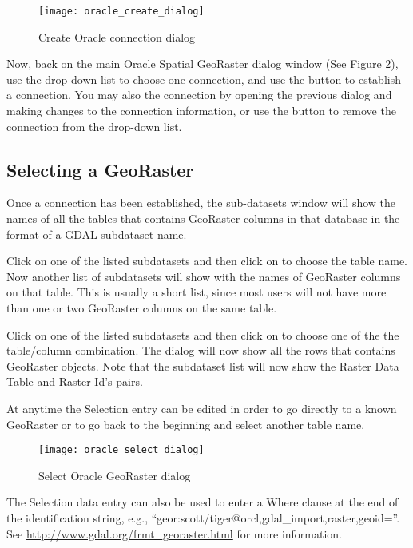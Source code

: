\begin{figure}[ht]
   \centering
   \texttt{[image: oracle\_create\_dialog]}   
   \caption{Create Oracle connection dialog \nixcaption}\label{fig:oracle_create}
\end{figure}

Now, back on the main Oracle Spatial GeoRaster dialog window (See Figure \ref{fig:oracle_select}), use the 
drop-down list to choose one connection, and use the  button to establish a connection. You 
may also  the connection by opening the previous dialog and making changes to the connection 
information, or use the  button to remove the connection from the drop-down list.

\subsection{Selecting a GeoRaster}

Once a connection has been established, the sub-datasets window will show the names of all the tables that 
contains GeoRaster columns in that database in the format of a GDAL subdataset name.

Click on one of the listed subdatasets and then click on  to choose the table name. Now another 
list of subdatasets will show with the names of GeoRaster columns on that table. This is usually a short list, 
since most users will not have more than one or two GeoRaster columns on the same table.

Click on one of the listed subdatasets and then click on  to choose one of the the table/column 
combination. The dialog will now show all the rows that contains GeoRaster objects. Note that the subdataset 
list will now show the Raster Data Table and Raster Id's pairs.

At anytime the Selection entry can be edited in order to go directly to a known GeoRaster or to go back to the 
beginning and select another table name.

\begin{figure}[ht]
   \centering
   \texttt{[image: oracle\_select\_dialog]}   
   \caption{Select Oracle GeoRaster dialog \nixcaption}\label{fig:oracle_select}
\end{figure}

The Selection data entry can also be used to enter a Where clause at the end of the  identification string, e.g., 
``geor:scott/tiger@orcl,gdal\_import,raster,geoid=''. See \url{http://www.gdal.org/frmt_georaster.html} for more information.

